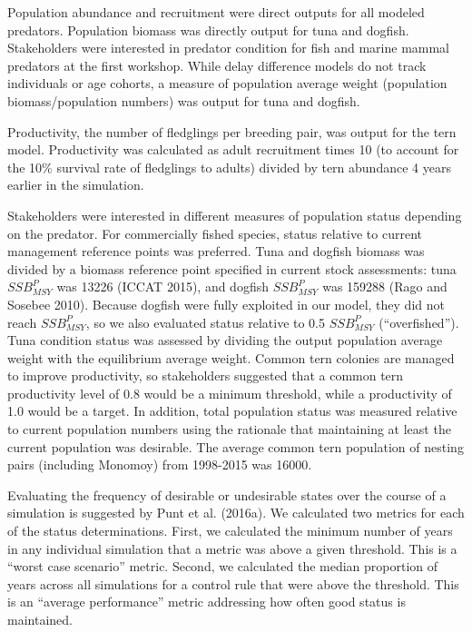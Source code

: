 \documentclass[]{article}
\begin{document}
Population abundance and recruitment were direct outputs for all modeled
predators. Population biomass was directly output for tuna and dogfish.
Stakeholders were interested in predator condition for fish and marine
mammal predators at the first workshop. While delay difference models do
not track individuals or age cohorts, a measure of population average
weight (population biomass/population numbers) was output for tuna and
dogfish.

Productivity, the number of fledglings per breeding pair, was output for
the tern model. Productivity was calculated as adult recruitment times
10 (to account for the 10\% survival rate of fledglings to adults)
divided by tern abundance 4 years earlier in the simulation.

Stakeholders were interested in different measures of population status
depending on the predator. For commercially fished species, status
relative to current management reference points was preferred. Tuna and
dogfish biomass was divided by a biomass reference point specified in
current stock assessments: tuna \(SSB_{MSY}^P\) was 13226 (ICCAT 2015),
and dogfish \(SSB_{MSY}^P\) was 159288 (Rago and Sosebee 2010). Because
dogfish were fully exploited in our model, they did not reach
\(SSB_{MSY}^P\), so we also evaluated status relative to 0.5
\(SSB_{MSY}^P\) (``overfished''). Tuna condition status was assessed by
dividing the output population average weight with the equilibrium
average weight. Common tern colonies are managed to improve
productivity, so stakeholders suggested that a common tern productivity
level of 0.8 would be a minimum threshold, while a productivity of 1.0
would be a target. In addition, total population status was measured
relative to current population numbers using the rationale that
maintaining at least the current population was desirable. The average
common tern population of nesting pairs (including Monomoy) from
1998-2015 was 16000.

Evaluating the frequency of desirable or undesirable states over the
course of a simulation is suggested by Punt et al. (2016a). We
calculated two metrics for each of the status determinations. First, we
calculated the minimum number of years in any individual simulation that
a metric was above a given threshold. This is a ``worst case scenario''
metric. Second, we calculated the median proportion of years across all
simulations for a control rule that were above the threshold. This is an
``average performance'' metric addressing how often good status is
maintained.
\end{document}
